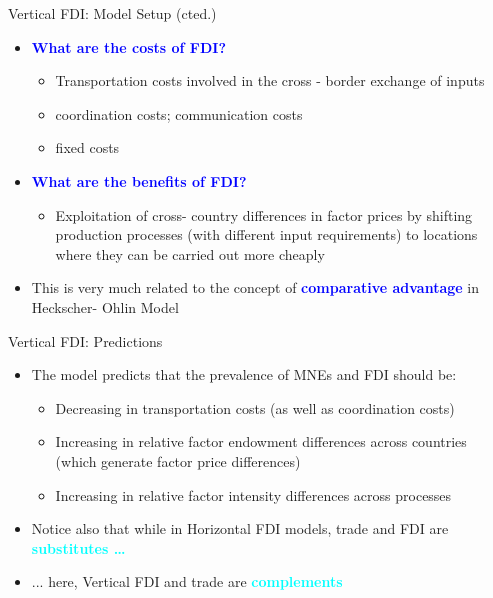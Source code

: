 \documentclass[10pt,hyperref={CJKbookmarks=true},xcolor=dvipsnames,aspectratio=169]{beamer}
\begin{document}
\begin{frame}{Vertical FDI: Model Setup (cted.) }

\begin{itemize}
\item \textbf{\textcolor{blue}{What are the costs of FDI? }}

\begin{itemize}
\item Transportation costs involved in the cross - border exchange of inputs
\item coordination costs; communication costs
\item fixed costs 
\end{itemize}
\item \textbf{\textcolor{blue}{What are the benefits of FDI?}}

\begin{itemize}
\item Exploitation of cross- country differences in factor prices by shifting
production processes (with different input requirements) to locations
where they can be carried out more cheaply 
\end{itemize}
\item This is very much related to the concept of \textbf{\textcolor{blue}{comparative
advantage}} in Heckscher- Ohlin Model 
\end{itemize}
\end{frame}

\begin{frame}{Vertical FDI: Predictions }

\begin{itemize}
\item The model predicts that the prevalence of MNEs and FDI should be: 

\begin{itemize}
\item Decreasing in transportation costs (as well as coordination costs) 
\item Increasing in relative factor endowment differences across countries
(which generate factor price differences) 
\item Increasing in relative factor intensity differences across processes 
\end{itemize}
\item Notice also that while in Horizontal FDI models, trade and FDI are
\textbf{\textcolor{cyan}{substitutes … }}
\item ... here, Vertical FDI and trade are \textbf{\textcolor{cyan}{complements }}
\end{itemize}
\end{frame}
\end{document}
